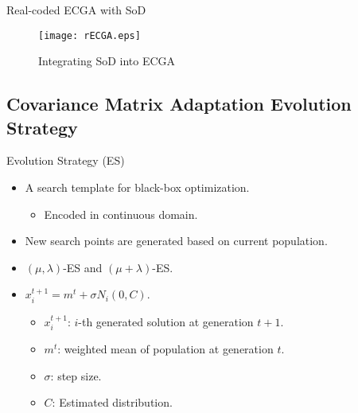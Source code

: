 \begin{frame}{Real-coded ECGA with SoD}
  \vspace*{14pt}
  \begin{figure}
    \flushleft
    
    \texttt{[image: rECGA.eps]}
    \caption{Integrating SoD into ECGA}
  \end{figure}
\end{frame}

\subsection{Covariance Matrix Adaptation Evolution Strategy}


\begin{frame}{Evolution Strategy (ES)}
  \begin{itemize}
    \item A search template for black-box optimization.
      \begin{itemize}
        \item Encoded in continuous domain.
      \end{itemize}
      \vspace*{14pt}
    \item New search points are generated based on current population.
      \vspace*{14pt}
    \item $(\mu,\lambda)$-ES and $(\mu+\lambda)$-ES.
      \vspace*{14pt}
    \item $x_i^{t+1} = m^t + \sigma N_i(0,C)$.
      \begin{itemize}
        \item $x_i^{t+1}$: $i$-th generated solution at generation $t+1$.
        \item $m^t$: weighted mean of population at generation $t$.
        \item $\sigma$: step size.
        \item $C$: Estimated distribution.
      \end{itemize}
  \end{itemize}
\end{frame}

